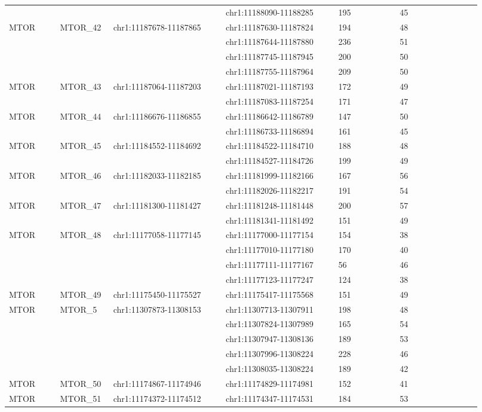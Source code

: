 \begin{landscape}
\begin{longtable}{p{0.1\linewidth}|p{0.1\linewidth}p{0.22\linewidth}p{0.22\linewidth}p{0.12\linewidth}p{0.16\linewidth}}
 & & & chr1:11188090-11188285 & 195 & 45
\\
MTOR & MTOR\_42 & chr1:11187678-11187865 & chr1:11187630-11187824 & 194 & 48
\\
 & & & chr1:11187644-11187880 & 236 & 51
\\
 & & & chr1:11187745-11187945 & 200 & 50
\\
 & & & chr1:11187755-11187964 & 209 & 50
\\
MTOR & MTOR\_43 & chr1:11187064-11187203 & chr1:11187021-11187193 & 172 & 49
\\
 & & & chr1:11187083-11187254 & 171 & 47
\\
MTOR & MTOR\_44 & chr1:11186676-11186855 & chr1:11186642-11186789 & 147 & 50
\\
 & & & chr1:11186733-11186894 & 161 & 45
\\
MTOR & MTOR\_45 & chr1:11184552-11184692 & chr1:11184522-11184710 & 188 & 48
\\
 & & & chr1:11184527-11184726 & 199 & 49
\\
MTOR & MTOR\_46 & chr1:11182033-11182185 & chr1:11181999-11182166 & 167 & 56
\\
 & & & chr1:11182026-11182217 & 191 & 54
\\
MTOR & MTOR\_47 & chr1:11181300-11181427 & chr1:11181248-11181448 & 200 & 57
\\
 & & & chr1:11181341-11181492 & 151 & 49
\\
MTOR & MTOR\_48 & chr1:11177058-11177145 & chr1:11177000-11177154 & 154 & 38
\\
 & & & chr1:11177010-11177180 & 170 & 40
\\
 & & & chr1:11177111-11177167 & 56 & 46
\\
 & & & chr1:11177123-11177247 & 124 & 38
\\
MTOR & MTOR\_49 & chr1:11175450-11175527 & chr1:11175417-11175568 & 151 & 49
\\
MTOR & MTOR\_5 & chr1:11307873-11308153 & chr1:11307713-11307911 & 198 & 48
\\
 & & & chr1:11307824-11307989 & 165 & 54
\\
 & & & chr1:11307947-11308136 & 189 & 53
\\
 & & & chr1:11307996-11308224 & 228 & 46
\\
 & & & chr1:11308035-11308224 & 189 & 42
\\
MTOR & MTOR\_50 & chr1:11174867-11174946 & chr1:11174829-11174981 & 152 & 41
\\
MTOR & MTOR\_51 & chr1:11174372-11174512 & chr1:11174347-11174531 & 184 & 53

\end{longtable}
\end{landscape}
